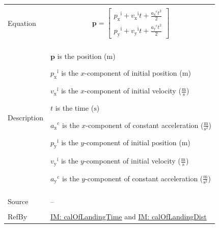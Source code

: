 \documentclass[12pt]{article}
\begin{document}
\begin{minipage}{\textwidth}
\begin{tabular}{>{\raggedright}p{}>{\raggedright\arraybackslash}p{}}
\\ \midrule \\
Equation & \begin{displaymath}
           \mathbf{p}=\begin{bmatrix}
                      {{p_{\text{x}}}^{\text{i}}}+{{v_{\text{x}}}^{\text{i}}} t+\frac{{{a_{\text{x}}}^{\text{c}}} t^{2}}{2}\\
                      {{p_{\text{y}}}^{\text{i}}}+{{v_{\text{y}}}^{\text{i}}} t+\frac{{{a_{\text{y}}}^{\text{c}}} t^{2}}{2}
                      \end{bmatrix}
           \end{displaymath}
\\ \midrule \\
Description & \begin{symbDescription}
              \item{$\mathbf{p}$ is the position (${\text{m}}$)}
              \item{${{p_{\text{x}}}^{\text{i}}}$ is the $x$-component of initial position (${\text{m}}$)}
              \item{${{v_{\text{x}}}^{\text{i}}}$ is the $x$-component of initial velocity ($\frac{\text{m}}{\text{s}}$)}
              \item{$t$ is the time (${\text{s}}$)}
              \item{${{a_{\text{x}}}^{\text{c}}}$ is the $x$-component of constant acceleration ($\frac{\text{m}}{\text{s}^{2}}$)}
              \item{${{p_{\text{y}}}^{\text{i}}}$ is the $y$-component of initial position (${\text{m}}$)}
              \item{${{v_{\text{y}}}^{\text{i}}}$ is the $y$-component of initial velocity ($\frac{\text{m}}{\text{s}}$)}
              \item{${{a_{\text{y}}}^{\text{c}}}$ is the $y$-component of constant acceleration ($\frac{\text{m}}{\text{s}^{2}}$)}
              \end{symbDescription}
\\ \midrule \\
Source & --
         
\\ \midrule \\
RefBy & \hyperref[IM:calOfLandingTime]{IM: calOfLandingTime} and \hyperref[IM:calOfLandingDist]{IM: calOfLandingDist}
        
\\ \bottomrule
\end{tabular}
\end{minipage}
\end{document}
